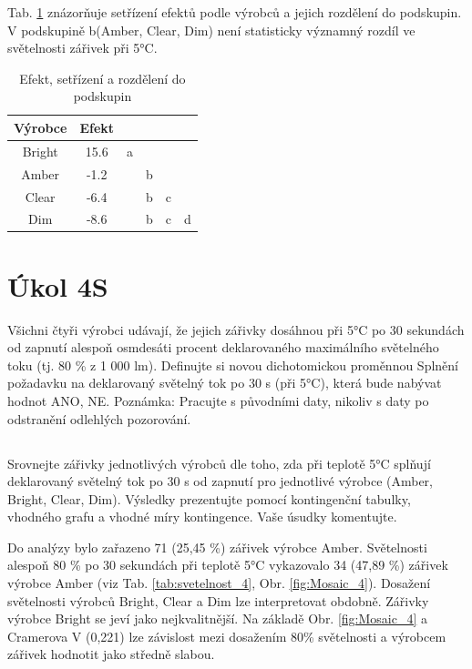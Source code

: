 \documentclass[czech]{article}%
\begin{document}
Tab. \ref{tab:efekty_3} znázorňuje setřízení efektů podle výrobců a jejich rozdělení do podskupin.
V podskupině b(Amber, Clear, Dim) není statisticky významný rozdíl ve světelnosti zářivek při 5°C.

\begin{table}[H]
	\centering
	\caption{Efekt, setřízení a rozdělení do podskupin}
	\label{tab:efekty_3}
    \begin{tabular}{c|c|c|c|c|c}
        Výrobce & Efekt &   &   &   &   \\
        \hline
        Bright  & 15.6  & a &   &   &   \\
        \hline
        Amber   & -1.2  &   & b &   &   \\
        \hline
        Clear   & -6.4  &   & b & c &   \\
        \hline
        Dim     & -8.6  &   & b & c & d \\
    \end{tabular}
\end{table}


\newpage
\section{Úkol 4S}
Všichni čtyři výrobci udávají, že jejich zářivky dosáhnou při 5°C po 30 sekundách 
od zapnutí alespoň osmdesáti procent deklarovaného maximálního světelného toku (tj. 80 
\% z 1 000 lm). Definujte si novou dichotomickou proměnnou Splnění požadavku na deklarovaný 
světelný tok po 30 s (při 5°C), která bude nabývat hodnot {ANO, NE}. 
Poznámka: Pracujte s původními daty, nikoliv s daty po odstranění odlehlých pozorování.


\subsection{}
Srovnejte zářivky jednotlivých výrobců dle toho, zda při teplotě 5°C splňují deklarovaný 
světelný tok po 30 s od zapnutí pro jednotlivé výrobce (Amber, Bright, Clear, Dim). 
Výsledky prezentujte pomocí kontingenční tabulky, vhodného grafu a vhodné míry kontingence. 
Vaše úsudky komentujte.

Do analýzy bylo zařazeno 71 (25,45 \%) zářivek výrobce Amber. 
Světelnosti alespoň 80 \% po 30 sekundách při teplotě 5°C vykazovalo 34 (47,89 \%) 
zářivek výrobce Amber (viz Tab. \ref{tab:svetelnost_4}, Obr. \ref{fig:Mosaic_4}). 
Dosažení světelnosti výrobců Bright, Clear a Dim lze interpretovat obdobně.
Zářivky výrobce Bright se jeví jako nejkvalitnější.
Na základě Obr. \ref{fig:Mosaic_4} a Cramerova V (0,221) lze závislost 
mezi dosažením 80\% světelnosti a výrobcem zářivek hodnotit jako středně slabou.
\end{document}

